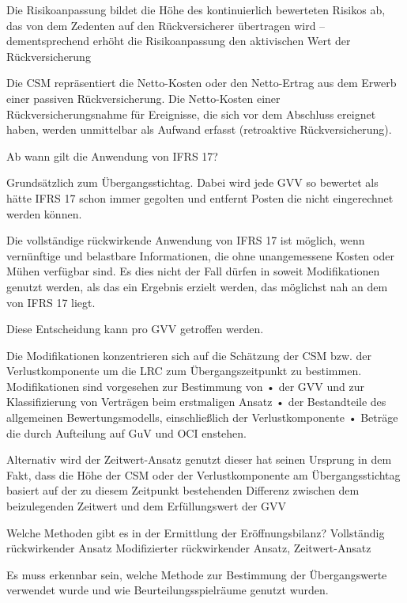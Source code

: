 Die Risikoanpassung bildet die Höhe des kontinuierlich
bewerteten Risikos ab, das von dem Zedenten auf den
Rückversicherer übertragen wird – dementsprechend erhöht
die Risikoanpassung den aktivischen Wert der
Rückversicherung

Die CSM repräsentiert die Netto-Kosten oder den Netto-Ertrag aus dem Erwerb einer passiven Rückversicherung.
Die Netto-Kosten einer Rückversicherungsnahme für Ereignisse, die sich vor dem Abschluss ereignet haben, werden unmittelbar als
Aufwand erfasst (retroaktive Rückversicherung).



Ab wann gilt die Anwendung von IFRS 17?

Grundsätzlich zum Übergangsstichtag. Dabei wird jede GVV so bewertet als hätte IFRS 17 schon immer gegolten und entfernt
Posten die nicht eingerechnet werden können.


Die vollständige rückwirkende Anwendung von IFRS 17 ist möglich, wenn vernünftige und belastbare Informationen, 
die ohne unangemessene Kosten oder Mühen verfügbar sind. Es dies nicht der Fall dürfen in soweit Modifikationen genutzt werden,
als das ein Ergebnis erzielt werden, das möglichst nah an dem von IFRS 17 liegt.

Diese Entscheidung kann pro GVV getroffen werden.

Die Modifikationen konzentrieren sich auf die Schätzung der CSM bzw. der Verlustkomponente um die LRC zum Übergangszeitpunkt zu bestimmen.
Modifikationen sind vorgesehen zur Bestimmung von
• der GVV und zur Klassifizierung von Verträgen beim erstmaligen Ansatz
• der Bestandteile des allgemeinen Bewertungsmodells, einschließlich der Verlustkomponente
• Beträge die durch Aufteilung auf GuV und OCI enstehen.

Alternativ wird der Zeitwert-Ansatz genutzt
dieser hat seinen Ursprung in dem Fakt, dass die Höhe der CSM oder der Verlustkomponente am Übergangsstichtag basiert auf der zu diesem Zeitpunkt
bestehenden Differenz zwischen dem beizulegenden Zeitwert und dem Erfüllungswert der GVV


Welche Methoden gibt es in der Ermittlung der Eröffnungsbilanz?
Vollständig rückwirkender Ansatz
Modifizierter rückwirkender Ansatz,
Zeitwert-Ansatz

Es muss erkennbar sein, welche Methode zur Bestimmung der Übergangswerte verwendet wurde und wie
Beurteilungsspielräume genutzt wurden.
